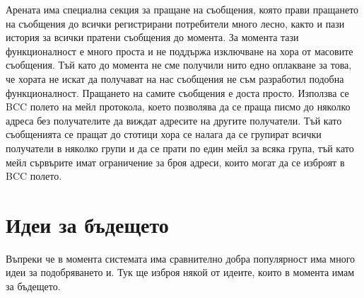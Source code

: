 \documentclass[a4paper,12pt]{article}
\begin{document}
  Арената има специална секция за пращане на съобщения, която прави пращането на съобщения до всички регистрирани потребители много лесно, както и пази история за всички пратени съобщения до момента. За момента тази функционалност е много проста и не поддържа изключване на хора от масовите съобщения. Тъй като до момента не сме получили нито едно оплакване за това, че хората не искат да получават на нас съобщения не съм разработил подобна функционалност. Пращането на самите съобщения е доста просто. Използва се BCC полето на мейл протокола, което позволява да се праща писмо до няколко адреса без получателите да виждат адресите на другите получатели. Тъй като съобщенията се пращат до стотици хора се налага да се групират всички получатели в няколко групи и да се прати по един мейл за всяка група, тъй като мейл сървърите имат ограничение за броя адреси, които могат да се изброят в BCC полето.
  
  \section{Идеи за бъдещето}
    Въпреки че в момента системата има сравнително добра популярност има много идеи за подобряването и. Тук ще изброя някой от идеите, които в момента имам за бъдещето.
    
\end{document}
